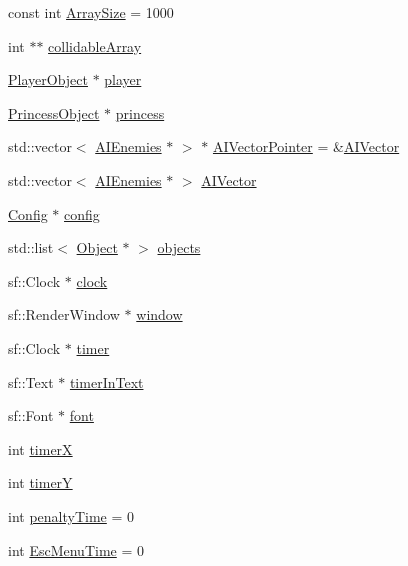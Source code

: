 \begin{DoxyCompactItemize}
\item 
const int \hyperlink{classTestApp_a980934e42fe32913bde240b0e68431dd}{Array\+Size} = 1000
\item 
int $\ast$$\ast$ \hyperlink{classTestApp_abd825724564edeb067da3c6f2c4a5f5f}{collidable\+Array}
\item 
\hyperlink{classPlayerObject}{Player\+Object} $\ast$ \hyperlink{classTestApp_a72c21fba56a65699606328b9e765d6db}{player}
\item 
\hyperlink{classPrincessObject}{Princess\+Object} $\ast$ \hyperlink{classTestApp_a99d5d1cabf9afb7550bac5a504f72875}{princess}
\item 
std\+::vector$<$ \hyperlink{classAIEnemies}{A\+I\+Enemies} $\ast$ $>$ $\ast$ \hyperlink{classTestApp_ac409d674f567c5d2ea773bd7ec3036d9}{A\+I\+Vector\+Pointer} = \&\hyperlink{classTestApp_aaea1384b8c39b22595b4e583e4edc972}{A\+I\+Vector}
\item 
std\+::vector$<$ \hyperlink{classAIEnemies}{A\+I\+Enemies} $\ast$ $>$ \hyperlink{classTestApp_aaea1384b8c39b22595b4e583e4edc972}{A\+I\+Vector}
\item 
\hyperlink{classConfig}{Config} $\ast$ \hyperlink{classTestApp_a17c4f18d8ef7c19da731a4bd13040d25}{config}
\item 
std\+::list$<$ \hyperlink{classObject}{Object} $\ast$ $>$ \hyperlink{classTestApp_a8fbfb637e9e690ef9179cce7151c86c5}{objects}
\item 
sf\+::\+Clock $\ast$ \hyperlink{classTestApp_a270d3cec0f81d6522f1fc1dc4b870cb5}{clock}
\item 
sf\+::\+Render\+Window $\ast$ \hyperlink{classTestApp_a0b6b080a777092db64519ef7c4309105}{window}
\item 
sf\+::\+Clock $\ast$ \hyperlink{classTestApp_aa0f4ce165f864c08bee05f1e5b94f295}{timer}
\item 
sf\+::\+Text $\ast$ \hyperlink{classTestApp_a24027afb144ddefb348e6589029dddb3}{timer\+In\+Text}
\item 
sf\+::\+Font $\ast$ \hyperlink{classTestApp_abdcc9c2825cc0e067f2d59015e27c310}{font}
\item 
int \hyperlink{classTestApp_ae4104d851cc307f78aea84b97466379e}{timerX}
\item 
int \hyperlink{classTestApp_a4d3ec75485dcab93d8908cd9cb33ff0f}{timerY}
\item 
int \hyperlink{classTestApp_a51cfb72ed25d079befa8575019fed98d}{penalty\+Time} = 0
\item 
int \hyperlink{classTestApp_a883d1e592173bceff4766eba17c47796}{Esc\+Menu\+Time} = 0
$$
\end{DoxyCompactItemize}
